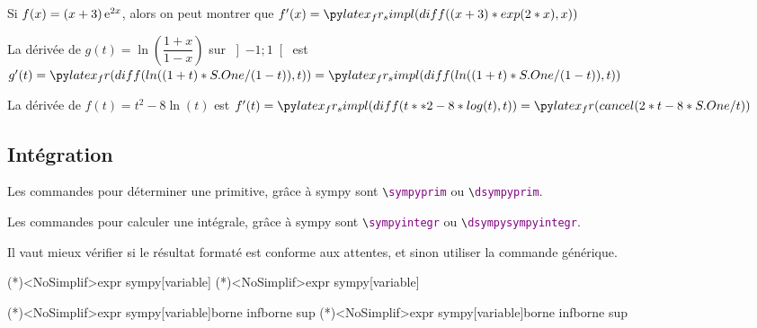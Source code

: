 \documentclass[french,a4paper,11pt]{article}
\begin{document}
\begin{bloctext}
Si $f(x)=(x+3)\,\mathrm{e}^{2x}$, alors on peut montrer que $f'(x) = \sympyderiv{(x+3)*exp(2*x)}$
\end{bloctext}

\begin{bloctext}
La dérivée de $g(t)=\ln\left(\dfrac{1+x}{1-x}\right)$ sur
$\left]-1;1\right[$ est $g'(t) = \dsympyderiv<NoSimplif>{ln((1+t)/(1-t))}[t]
= \dsympyderiv{ln((1+t)/(1-t))}[t]$
\end{bloctext}

\begin{bloctext}
La dérivée de $f(t)=t^2-8\ln(t)$ est 
$f'(t)= \dsympyderiv{t**2-8*log(t)}[t] = \dsympycalc<NoSimplif>{cancel(2*t-8/t)}$
\end{bloctext}

\subsection{Intégration}

\begin{cautionblock}
Les commandes pour déterminer une primitive, grâce à \textsf{sympy} sont \texttt{\textbackslash \textcolor{purple}{sympyprim}} ou \texttt{\textbackslash \textcolor{purple}{dsympyprim}}.

\smallskip

Les commandes pour calculer une intégrale, grâce à \textsf{sympy} sont \texttt{\textbackslash \textcolor{purple}{sympyintegr}} ou \texttt{\textbackslash \textcolor{purple}{dsympysympyintegr}}.

\smallskip

Il vaut mieux vérifier si le résultat formaté est conforme aux attentes, et sinon utiliser la commande générique.
\end{cautionblock}

\begin{bloctext}
\sympyprim(*)<NoSimplif>{expr sympy}[variable]
\dsympyprim(*)<NoSimplif>{expr sympy}[variable]

\sympyintegr(*)<NoSimplif>{expr sympy}[variable]{borne inf}{borne sup}
\dsympyintegr(*)<NoSimplif>{expr sympy}[variable]{borne inf}{borne sup}
\end{bloctext}
\end{document}
